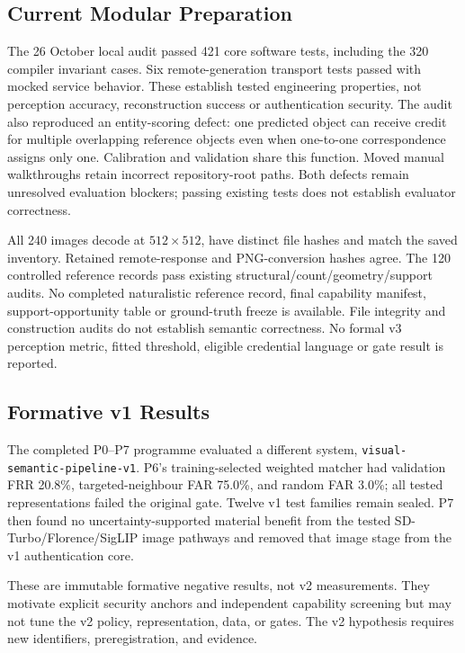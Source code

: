 \documentclass[compsoc,conference,a4paper,10pt,times]{IEEEtran}
\begin{document}
\subsection{Current Modular Preparation}
The 26 October local audit passed 421 core software tests, including the 320 compiler invariant cases. Six remote-generation transport tests passed with mocked service behavior. These establish tested engineering properties, not perception accuracy, reconstruction success or authentication security. The audit also reproduced an entity-scoring defect: one predicted object can receive credit for multiple overlapping reference objects even when one-to-one correspondence assigns only one. Calibration and validation share this function. Moved manual walkthroughs retain incorrect repository-root paths. Both defects remain unresolved evaluation blockers; passing existing tests does not establish evaluator correctness.

All 240 images decode at $512\times512$, have distinct file hashes and match the saved inventory. Retained remote-response and PNG-conversion hashes agree. The 120 controlled reference records pass existing structural/count/geometry/support audits. No completed naturalistic reference record, final capability manifest, support-opportunity table or ground-truth freeze is available. File integrity and construction audits do not establish semantic correctness. No formal v3 perception metric, fitted threshold, eligible credential language or gate result is reported.

\subsection{Formative v1 Results}
The completed P0--P7 programme evaluated a different system, \texttt{visual-semantic-pipeline-v1}. P6's training-selected weighted matcher had validation FRR 20.8\%, targeted-neighbour FAR 75.0\%, and random FAR 3.0\%; all tested representations failed the original gate. Twelve v1 test families remain sealed. P7 then found no uncertainty-supported material benefit from the tested SD-Turbo/Florence/SigLIP image pathways and removed that image stage from the v1 authentication core.

These are immutable formative negative results, not v2 measurements. They motivate explicit security anchors and independent capability screening but may not tune the v2 policy, representation, data, or gates. The v2 hypothesis requires new identifiers, preregistration, and evidence.
\end{document}
